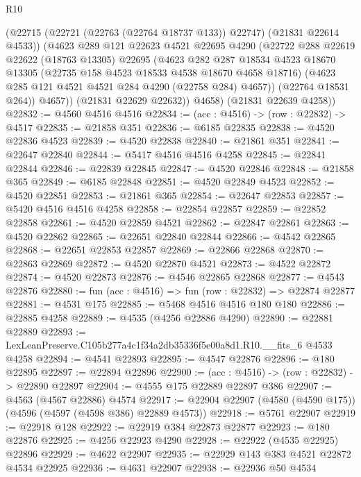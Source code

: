 \begin{lexlean}{R10}
\begin{coremodule}
            (@22715 (@22721 (@22763 (@22764 @18737 @133)) @22747) (@21831 @22614 @4533))
            (@4623
              @289
              @121
              @22623
              @4521
              @22695
              @4290
              (@22722
                @288
                @22619
                @22622
                (@18763 @13305)
                @22695
                (@4623
                  @282
                  @287
                  @18534
                  @4523
                  @18670
                  @13305
                  (@22735 @158 @4523 @18533 @4538 @18670 @4658 @18716)
                  (@4623 @285 @121 @4521 @4521 @284 @4290 (@22758 @284) @4657))
                (@22764 @18531 @264))
              @4657))
          (@21831 @22629 @22632))
        @4658)
      (@21831 @22639 @4258))
@22832 := @4560 @4516 @4516
@22834 := (acc : @4516) -> (row : @22832) -> @4517
@22835 := @21858 @351
@22836 := @6185 @22835
@22838 := @4520 @22836 @4523
@22839 := @4520 @22838
@22840 := @21861 @351
@22841 := @22647 @22840
@22844 := @5417 @4516 @4516 @4258
@22845 := @22841 @22844
@22846 := @22839 @22845
@22847 := @4520 @22846
@22848 := @21858 @365
@22849 := @6185 @22848
@22851 := @4520 @22849 @4523
@22852 := @4520 @22851
@22853 := @21861 @365
@22854 := @22647 @22853
@22857 := @5420 @4516 @4516 @4258
@22858 := @22854 @22857
@22859 := @22852 @22858
@22861 := @4520 @22859 @4521
@22862 := @22847 @22861
@22863 := @4520 @22862
@22865 := @22651 @22840 @22844
@22866 := @4542 @22865
@22868 := @22651 @22853 @22857
@22869 := @22866 @22868
@22870 := @22863 @22869
@22872 := @4520 @22870 @4521
@22873 := @4522 @22872
@22874 := @4520 @22873
@22876 := @4546 @22865 @22868
@22877 := @4543 @22876
@22880 := fun (acc : @4516) => fun (row : @22832) => @22874 @22877
@22881 := @4531 @175
@22885 := @5468 @4516 @4516 @180 @180
@22886 := @22885 @4258
@22889 := @4535 (@4256 @22886 @4290)
@22890 := @22881 @22889
@22893 := LexLeanPreserve.C105b277a4c1f34a2db35336f5e00a8d1.R10.__fits_6 @4533 @4258
@22894 := @4541 @22893
@22895 := @4547 @22876
@22896 := @180 @22895
@22897 := @22894 @22896
@22900 := (acc : @4516) -> (row : @22832) -> @22890 @22897
@22904 := @4555 @175 @22889 @22897 @386
@22907 := @4563 (@4567 @22886) @4574
@22917 := @22904 @22907 (@4580 (@4590 @175)) (@4596 (@4597 (@4598 @386) @22889 @4573))
@22918 := @5761 @22907
@22919 := @22918 @128
@22922 := @22919 @384 @22873 @22877
@22923 := @180 @22876
@22925 := @4256 @22923 @4290
@22928 := @22922 (@4535 @22925) @22896
@22929 := @4622 @22907
@22935 := @22929 @143 @383 @4521 @22872 @4534 @22925
@22936 := @4631 @22907
@22938 := @22936 @50 @4534

\end{coremodule}
\end{lexlean}
